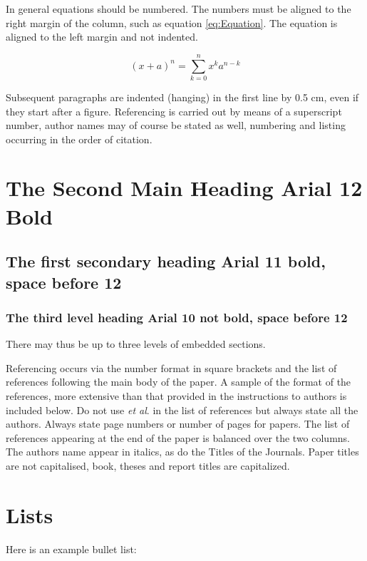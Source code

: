 \documentclass{RDJ}
\begin{document}
In general equations should be numbered. The numbers must be aligned to the right margin of the column, such as equation \ref{eq:Equation}. The equation is aligned to the left margin and not indented.

\begin{equation}
	(x+a)^n=\sum_{k=0}^nx^ka^{n-k} 
\end{equation}\label{eq:Equation}

Subsequent paragraphs are indented (hanging) in the first line by 0.5 cm, even if they start after a figure.  Referencing is carried out by means of a superscript number, author names may of course be stated as well, numbering and listing occurring in the order of citation.

\section{The Second Main Heading Arial 12 Bold}

\subsection{The first secondary heading Arial 11 bold, space before 12}

\subsubsection{The third level heading Arial 10 not bold, space before 12}

There may thus be up to three levels of embedded sections.

Referencing occurs via the number format in square brackets and the list of references following the main body of the paper.  A sample of the format of the references, more extensive than that provided in the instructions to authors is included below.   Do not use {\it et al}. in the list of references but always state all the authors. Always state page numbers or number of pages for papers.  The list of references appearing at the end of the paper is balanced over the two columns.  The authors name appear in italics, as do the Titles of the Journals.   Paper titles are not capitalised, book, theses and report titles are capitalized.

\section{Lists}

Here is an example bullet list:
\end{document}
